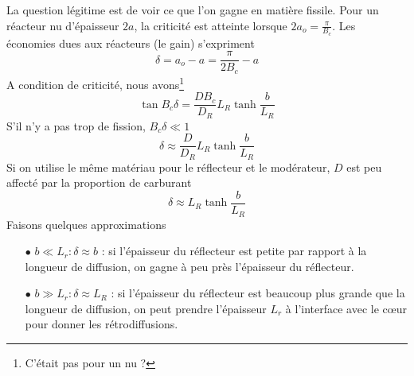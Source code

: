 La question légitime est de voir ce que l'on gagne en matière fissile. Pour un réacteur nu 
d'épaisseur $2a$, la criticité est atteinte lorsque $2{a_o} = \frac{\pi }{{{B_c}}}$. Les économies
dues aux réacteurs (le gain) s'expriment
\begin{equation}
\delta  = {a_o} - a = \frac{\pi }{{2{B_c}}} - a
\end{equation}
A condition de criticité, nous avons\footnote{C'était pas pour un nu ?}
\begin{equation}
\tan {B_c}\delta  = \frac{{D{B_c}}}{{{D_R}}}{L_R}\tanh \frac{b}{{{L_R}}}
\end{equation}
S'il n'y a pas trop de fission, $B_c\delta \ll 1$ 
\begin{equation}
\delta  \approx \frac{D}{{{D_R}}}{L_R}\tanh \frac{b}{{{L_R}}}
\end{equation}
Si on utilise le même matériau pour le réflecteur et le modérateur, $D$ est peu affecté par la 
proportion de carburant
\begin{equation}
\delta  \approx {L_R}\tanh \frac{b}{{{L_R}}}
\end{equation}
Faisons quelques approximations
\begin{itemize}
\item[$\bullet$] $b \ll L_r : \delta \approx b$ : si l'épaisseur du réflecteur est petite par rapport
à la longueur de diffusion, on gagne à peu près l'épaisseur du réflecteur.
\item[$\bullet$] $b \gg L_r : \delta \approx L_R$ : si l'épaisseur du réflecteur est beaucoup plus 
grande que la longueur de diffusion, on peut prendre l'épaisseur $L_r$ à l'interface avec le cœur 
pour donner les rétrodiffusions.
\end{itemize}


